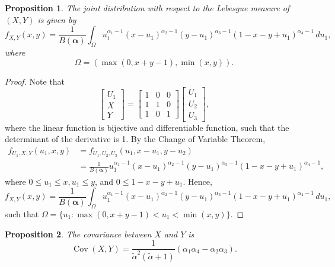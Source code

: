 \documentclass[a4paper, notitlepage, 11pt]{article}
\newtheorem{proposition}{Proposition}[]
\theoremstyle{definition}
\theoremstyle{remark}
\begin{document}
\begin{proposition}
  The joint distribution with respect to the Lebesgue measure of $(X,Y)$ is
  given by 
  \begin{equation}
    f_{X,Y}(x,y) = \frac{1}{B(\boldsymbol{\alpha})}\int_{\Omega} u_1^{\alpha_1 - 1}(x - u_1)^{\alpha_2 -1}(y-u_1)^{\alpha_3-1}(1-x-y+u_1)^{\alpha_4-1} \, du_1,
  \end{equation}
  where 
  $$
  \Omega = (\max(0, x+y-1), \min(x,y)).
  $$
\end{proposition}

\begin{proof}
  Note that
  $$
  \begin{bmatrix}
    U_1 \\ X \\ Y
  \end{bmatrix}  = \begin{bmatrix}
    1 & 0 & 0 \\
    1 & 1 & 0 \\
    1 & 0 & 1
  \end{bmatrix}\begin{bmatrix}
    U_1 \\ U_2 \\ U_3
  \end{bmatrix}, 
  $$
  where the linear function is bijective and differentiable function, such
  that the determinant of the derivative is 1. By the Change of Variable
  Theorem, 
  \begin{equation}
    \begin{split}
      f_{U_1,X,Y}(u_1,x,y) &= f_{U_1,U_2,U_3}(u_1, x - u_1, y - u_2) \\ 
      &= \frac{1}{B(\boldsymbol{\alpha})}u_1^{\alpha_1-1}(x-u_1)^{\alpha_2-1}(y-u_1 )^{\alpha_3-1}(1-x-y+u_1)^{\alpha_4-1},
    \end{split}
  \end{equation}
  where $0 \le u_1 \le x, u_1 \le y$, and $0 \le 1 - x - y + u_1$.  
  Hence,
  \begin{equation}
      \label{eq:dist-X-Y}
      f_{X,Y}(x,y) = \frac{1}{B(\boldsymbol{\alpha})}\int_{\Omega} u_1^{\alpha_1-1}(x-u_1)^{\alpha_2-1}(y-u_1)^{\alpha_3-1}(1-x-y+u_1)^{\alpha_4-1} \, du_1,
  \end{equation}
  such that $\Omega = \{u_1 : \max(0, x + y -1) < u_1 < \min(x,y)\}$.
\end{proof}

\begin{proposition}
  The covariance between $X$ and $Y$ is 
  $$\operatorname{Cov}(X,Y) = \frac{1}{\tilde{\alpha}^2(\tilde{\alpha}+1)}(\alpha_1\alpha_4 - \alpha_2\alpha_3).$$
\end{proposition}
\end{document}
